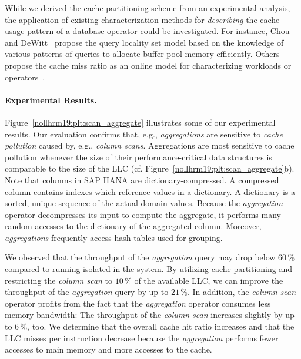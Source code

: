 \documentclass[11pt]{article}
\begin{document}
While we derived the cache partitioning scheme from an experimental analysis, the application of existing characterization methods for \emph{describing} the cache usage pattern of a database operator could be investigated.
For instance, Chou and DeWitt~\cite{nollhrm19:Chou:1985:EBM:1286760.1286772} propose the query locality set model based on the knowledge of various patterns of queries to allocate buffer pool memory efficiently.
Others propose the cache miss ratio as an online model for characterizing workloads or operators~\cite{nollhrm19:Tam:2009:RAL:1508244.1508259, nollhrm19:Manegold:2002:GDC:1287369.1287387, nollhrm19:Zhou:2004:DTP:1024393.1024415}.

\paragraph*{Experimental Results.}
Figure~\ref{nollhrm19:plt:scan_aggregate} illustrates some of our experimental results.
Our evaluation confirms that, e.g., \emph{aggregations} are sensitive to \emph{cache pollution} caused by, e.g., \emph{column scans}.
Aggregations are most sensitive to cache pollution whenever the size of their performance-critical data structures is comparable to the size of the LLC (cf. Figure~\ref{nollhrm19:plt:scan_aggregate}b).
Note that columns in SAP HANA are dictionary-compressed.
A compressed column contains indexes which reference values in a dictionary.
A dictionary is a sorted, unique sequence of the actual domain values.
Because the \emph{aggregation} operator decompresses its input to compute the aggregate, it performs many random accesses to the dictionary of the aggregated column.
Moreover, \emph{aggregations} frequently access hash tables used for grouping.

We observed that the throughput of the \emph{aggregation} query may drop below $60\,\mathrm{\%}$ compared to running isolated in the system.
By utilizing cache partitioning and restricting the \emph{column scan} to $10\,\mathrm{\%}$ of the available LLC, we can improve the throughput of the \emph{aggregation} query by up to $21\,\mathrm{\%}$.
In addition, the \emph{column scan} operator profits from the fact that the \emph{aggregation} operator consumes less memory bandwidth:
The throughput of the \emph{column scan} increases slightly by up to $6\,\mathrm{\%}$, too.
We determine that the overall cache hit ratio increases and that the LLC misses per instruction decrease because the \emph{aggregation} performs fewer accesses to main memory and more accesses to the cache.
\end{document}
